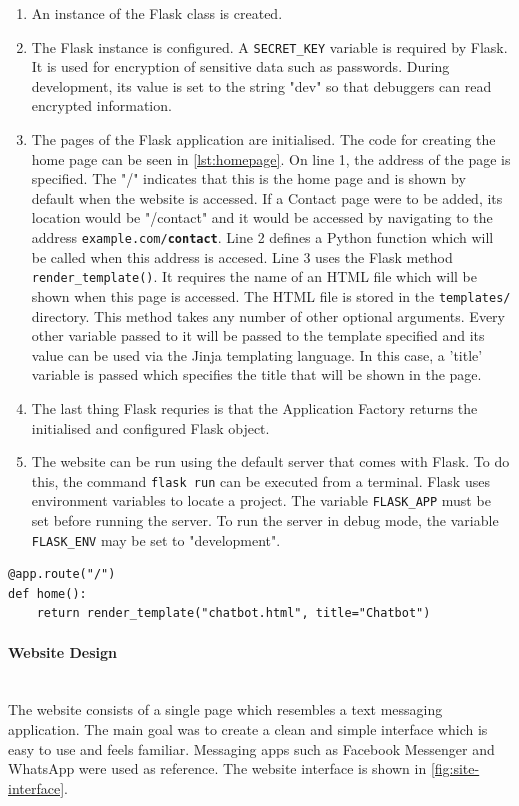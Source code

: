\documentclass[12pt,a4paper]{article}
\newcommand{\myparagraph}[1]{\paragraph{#1}\mbox{}\\}
\newcommand{\captionstyle}[1] {
    \small{#1}
}
\begin{document}
\begin{enumerate}
    \item An instance of the Flask class is created.
    \item The Flask instance is configured. A \texttt{SECRET\_KEY} variable is required by Flask. It is used for encryption of sensitive data such as passwords. During development, its value is set to the string "dev" so that debuggers can read encrypted information.
    \item The pages of the Flask application are initialised. The code for creating the home page can be seen in \cref{lst:homepage}. On line 1, the address of the page is specified. The "/" indicates that this is the home page and is shown by default when the website is accessed. If a Contact page were to be added, its location would be "/contact" and it would be accessed by navigating to the address \texttt{example.com/\textbf{contact}}. Line 2 defines a Python function which will be called when this address is accesed. Line 3 uses the Flask method \texttt{render\_template()}. It requires the name of an HTML file which will be shown when this page is accessed. The HTML file is stored in the \texttt{templates/} directory. This method takes any number of other optional arguments. Every other variable passed to it will be passed to the template specified and its value can be used via the Jinja templating language. In this case, a 'title' variable is passed which specifies the title that will be shown in the page.
    \item The last thing Flask requries is that the Application Factory returns the initialised and configured Flask object.
    \item The website can be run using the default server that comes with Flask. To do this, the command \texttt{flask run} can be executed from a terminal. Flask uses environment variables to locate a project. The variable \texttt{FLASK\_APP} must be set before running the server. To run the server in debug mode, the variable \texttt{FLASK\_ENV} may be set to "development". 
\end{enumerate}

\begin{lstlisting}[caption={\captionstyle{Initialisation of the home page of the Flask application.}}, label={lst:homepage}]
@app.route("/")
def home():
    return render_template("chatbot.html", title="Chatbot")
\end{lstlisting}

\myparagraph{Website Design}
The website consists of a single page which resembles a text messaging application. The main goal was to create a clean and simple interface which is easy to use and feels familiar. Messaging apps such as Facebook Messenger and WhatsApp were used as reference. The website interface is shown in \cref{fig:site-interface}.
\end{document}
